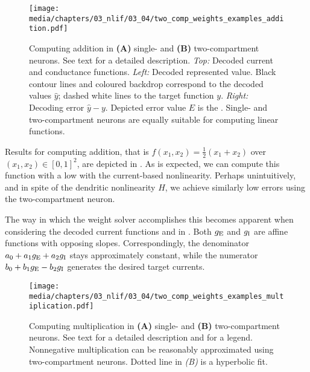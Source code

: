 \begin{figure}
	\centering
	\texttt{[image: media/chapters/03\_nlif/03\_04/two\_comp\_weights\_examples\_addition.pdf]}%
	{\label{fig:two_comp_weights_examples_addition_a}}%
	{\label{fig:two_comp_weights_examples_addition_b}}%
	\caption[Computing addition in single- and two-compartment neurons]{Computing addition in \textbf{(A)} single- and \textbf{(B)} two-compartment neurons. See text for a detailed description. \emph{Top:} Decoded current and conductance functions. \emph{Left:} Decoded represented value. Black contour lines and coloured backdrop correspond to the decoded values $\hat y$; dashed white lines to the target function $y$. \emph{Right:} Decoding error $\hat y - y$. Depicted error value $E$ is the \NRMSE.
	Single- and two-compartment neurons are equally suitable for computing linear functions.
	}
	\label{fig:two_comp_weights_examples_addition}
\end{figure}

Results for computing addition, that is $f(x_1, x_2) = \frac{1}2 (x_1 + x_2)$ over $(x_1, x_2) \in [0, 1]^2$, are depicted in .
As is expected, we can compute this function with a low \NRMSE with the current-based nonlinearity.
Perhaps unintuitively, and in spite of the dendritic nonlinearity $H$, we achieve similarly low errors using the two-compartment \LIF neuron.

The way in which the weight solver accomplishes this becomes apparent when considering the decoded current functions \gE and \gI in .
Both $g_\mathrm{E}$ and $g_\mathrm{I}$ are affine functions with opposing slopes.
Correspondingly, the denominator $a_0 + a_1 g_\mathrm{E} + a_2 g_\mathrm{I}$ stays approximately constant, while the numerator $b_0 + b_1 g_\mathrm{E} - b_2 g_\mathrm{I}$ generates the desired target currents.


\begin{figure}
	\centering
	\texttt{[image: media/chapters/03\_nlif/03\_04/two\_comp\_weights\_examples\_multiplication.pdf]}%
	{\label{fig:two_comp_weights_examples_multiplication_a}}%
	{\label{fig:two_comp_weights_examples_multiplication_b}}%
	\caption[Computing multiplication in single- and two-compartment neurons]{Computing multiplication in \textbf{(A)} single- and \textbf{(B)} two-compartment neurons. See text for a detailed description and  for a legend. Nonnegative multiplication can be reasonably approximated using two-compartment neurons. Dotted line in \emph{(B)} is a hyperbolic fit.
	}
	\label{fig:two_comp_weights_examples_multiplication}
\end{figure}


